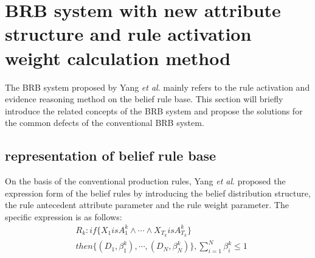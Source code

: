 \documentclass{ieeeaccess}
\begin{document}
\section{BRB system with new attribute structure and rule activation weight calculation method}
The BRB system proposed by Yang \textit{et al}.\cite{a1} mainly refers to the rule activation and evidence reasoning method on the belief rule base.
This section will briefly introduce the related concepts of the BRB system and propose the solutions for the common defects of the conventional BRB system.
\subsection{representation of belief rule base}
On the basis of the conventional production rules, Yang \textit{et al}.\cite{a1} proposed the expression form of the belief rules by introducing the belief distribution structure,
the rule antecedent attribute parameter and the rule weight parameter. The specific expression is as follows:
\begin{equation}
    \begin{split}
        &R_k:if\{X_1isA_1^k \wedge \cdots \wedge X_{T_k}isA_{T_k}^k\} \\
        &then\{(D_1,\beta_1^k),\cdots,(D_N,\beta_N^k)\},\sum_{i=1}^N\beta_i^k\leq1
    \end{split}
\end{equation}
\end{document}
